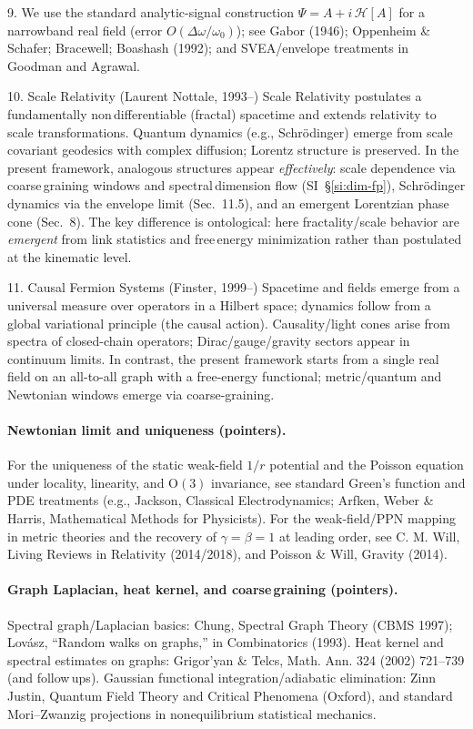 \documentclass[11pt]{article}
\begin{document}
9. We use the standard analytic-signal construction $\Psi = A + i\,\mathcal H[A]$ for a narrowband real field (error $O(\Delta\omega/\omega_0)$); see Gabor (1946); Oppenheim \& Schafer; Bracewell; Boashash (1992); and SVEA/envelope treatments in Goodman and Agrawal.

10. Scale Relativity (Laurent Nottale, 1993–)
\quad Scale Relativity postulates a fundamentally non\,differentiable (fractal) spacetime and extends relativity to scale transformations. Quantum dynamics (e.g., Schr\"odinger) emerge from scale\,covariant geodesics with complex diffusion; Lorentz structure is preserved. In the present framework, analogous structures appear \emph{effectively}: scale dependence via coarse\,graining windows and spectral\,dimension flow (SI~\S\ref{si:dim-fp}), Schr\"odinger dynamics via the envelope limit (Sec.~11.5), and an emergent Lorentzian phase cone (Sec.~8). The key difference is ontological: here fractality/scale behavior are \emph{emergent} from link statistics and free\,energy minimization rather than postulated at the kinematic level.

11. Causal Fermion Systems (Finster, 1999–)
\quad Spacetime and fields emerge from a universal measure over operators in a Hilbert space; dynamics follow from a global variational principle (the causal action). Causality/light cones arise from spectra of closed-chain operators; Dirac/gauge/gravity sectors appear in continuum limits. In contrast, the present framework starts from a single real field on an all-to-all graph with a free-energy functional; metric/quantum and Newtonian windows emerge via coarse-graining.

\paragraph{Newtonian limit and uniqueness (pointers).}
\noindent For the uniqueness of the static weak-field $1/r$ potential and the Poisson equation under locality, linearity, and $\mathrm O(3)$ invariance, see standard Green's function and PDE treatments (e.g., Jackson, Classical Electrodynamics; Arfken, Weber \& Harris, Mathematical Methods for Physicists). For the weak-field/PPN mapping in metric theories and the recovery of $\gamma=\beta=1$ at leading order, see C. M. Will, Living Reviews in Relativity (2014/2018), and Poisson \& Will, Gravity (2014).

\paragraph{Graph Laplacian, heat kernel, and coarse\,graining (pointers).}
\noindent Spectral graph/Laplacian basics: Chung, Spectral Graph Theory (CBMS 1997); Lov\'asz, ``Random walks on graphs,'' in Combinatorics (1993). Heat kernel and spectral estimates on graphs: Grigor'yan \& Telcs, Math. Ann.  324 (2002) 721--739 (and follow\,ups). Gaussian functional integration/adiabatic elimination: Zinn\,Justin, Quantum Field Theory and Critical Phenomena (Oxford), and standard Mori–Zwanzig projections in nonequilibrium statistical mechanics.
\end{document}
